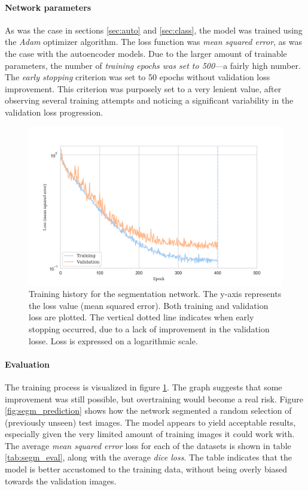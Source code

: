 \paragraph{Network parameters} As was the case in sections \textcolor{blue}{\ref{sec:auto}} and \textcolor{blue}{\ref{sec:class}}, the model was trained using the \textit{Adam} optimizer algorithm. The loss function was \textit{mean squared error}, as was the case with the autoencoder models. Due to the larger amount of trainable parameters, the number of \textit{training epochs was set to 500}---a fairly high number. The \textit{early stopping} criterion was set to 50 epochs without validation loss improvement. This criterion was purposely set to a very lenient value, after observing several training attempts and noticing a significant variability in the validation loss progression.

\begin{figure}[!htbp]
  \begin{center}
    \includegraphics[width=\linewidth, keepaspectratio]{images/segm_history}
    \caption{Training history for the segmentation network. The y-axis represents the loss value (mean squared error). Both training and validation loss are plotted. The vertical dotted line indicates when early stopping occurred, due to a lack of improvement in the validation losse. Loss is expressed on a logarithmic scale.}
    \label{fig:segm_history}
  \end{center}
\end{figure}

\paragraph{Evaluation} The training process is visualized in figure \textcolor{blue}{\ref{fig:segm_history}}. The graph suggests that some improvement was still possible, but overtraining would become a real risk. Figure \textcolor{blue}{\ref{fig:segm_prediction}} shows how the network segmented a random selection of (previously unseen) test images. The model appears to yield acceptable results, especially given the very limited amount of training images it could work with. The average \textit{mean squared error} loss for each of the datasets is shown in table \textcolor{blue}{\ref{tab:segm_eval}}, along with the average \textit{dice loss}. The table indicates that the model is better accustomed to the training data, without being overly biased towards the validation images.

